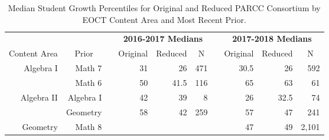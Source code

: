 \begin{table}[!tbp]
{\small
\caption{Median Student Growth Percentiles for Original and Reduced PARCC Consortium by EOCT Content Area and Most Recent Prior.\label{}} 
\begin{center}
\begin{tabular}{rrcrrrcrrr}
\hline\hline
\multicolumn{2}{c}{\bfseries }&\multicolumn{1}{c}{\bfseries }&\multicolumn{3}{c}{\bfseries 2016-2017 Medians}&\multicolumn{1}{c}{\bfseries }&\multicolumn{3}{c}{\bfseries 2017-2018 Medians}\tabularnewline
\cline{4-6} \cline{8-10}
\multicolumn{1}{c}{Content Area}&\multicolumn{1}{c}{Prior}&\multicolumn{1}{c}{}&\multicolumn{1}{c}{Original}&\multicolumn{1}{c}{Reduced}&\multicolumn{1}{c}{N}&\multicolumn{1}{c}{}&\multicolumn{1}{c}{Original}&\multicolumn{1}{c}{Reduced}&\multicolumn{1}{c}{N}\tabularnewline
\hline
Algebra I& Math 7&&31&26&471&&30.5&26&592\tabularnewline
& Math 6&&50&41.5&116&&65&63&61\tabularnewline
Algebra II& Algebra I&&42&39&8&&26&32.5&74\tabularnewline
& Geometry&&58&42&259&&57&47&241\tabularnewline
Geometry& Math 8&&&&&&47&49&2,101\tabularnewline
\hline
\end{tabular}\end{center}}
\end{table}
